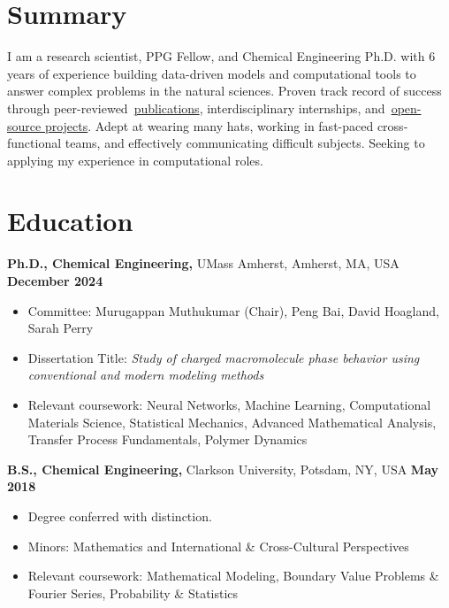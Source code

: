 \documentclass[margin,line]{res}
\begin{document}
\newcommand{\myname}{Samuel C.~Hoover}
\newlength{\mynamewidth}
\settowidth{\mynamewidth}{\namefont\myname}

\name{\hspace*{0.5\textwidth}\hspace{-0.5\mynamewidth} \myname \vspace*{.1in}}
\thispagestyle{empty}

\begin{resume}

	

	\section{Summary}
	I am a research scientist, PPG Fellow, and Chemical Engineering Ph.D. with 6
	years of experience building data-driven models and computational tools to
	answer complex problems in the natural sciences. Proven track record of
	success through
	peer-reviewed~\href{https://scholar.google.com/citations?hl=en&user=nKKVSjwAAAAJ&vi}{publications},
	interdisciplinary internships,
	and~\href{https://github.com/samuelhoover}{open-source projects}. Adept at
	wearing many hats, working in fast-paced cross-functional teams, and
	effectively communicating difficult subjects. Seeking to applying my
	experience in computational roles.

	\section{\sc Education}
	 {\bf Ph.D., Chemical Engineering,} UMass Amherst, Amherst, MA, USA \hfill {\bf December 2024}\\
	\vspace*{-.1in}
	\begin{itemize}
		\item[ ] Committee: Murugappan Muthukumar (Chair), Peng Bai, David Hoagland, Sarah Perry
		\item[ ] Dissertation Title: {\it Study of charged macromolecule phase
		      behavior using conventional and modern modeling methods}
		\item [ ] Relevant coursework: Neural Networks, Machine Learning,
		      Computational Materials Science, Statistical Mechanics, Advanced
		      Mathematical Analysis, Transfer Process Fundamentals, Polymer Dynamics
	\end{itemize}

	{\bf B.S., Chemical Engineering,} Clarkson University, Potsdam, NY, USA \hfill {\bf May 2018}\\
	\vspace*{-.1in}
	\begin{itemize}
		\item[ ] Degree conferred with distinction.
		\item[ ] Minors: Mathematics and International \& Cross-Cultural Perspectives
		\item[ ] Relevant coursework: Mathematical Modeling, Boundary Value
		      Problems \& Fourier Series, Probability \& Statistics
	\end{itemize}


\end{resume}
\end{document}
